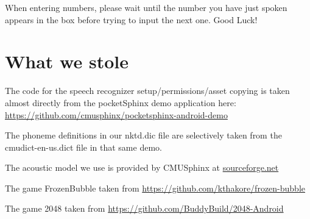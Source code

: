 \documentclass[11pt, oneside]{article}
\begin{document}
When entering numbers, please wait until the number you have just spoken appears
in the box before trying to input the next one.
Good Luck!

\section{What we stole}

The code for the speech recognizer setup/permissions/asset copying is
taken almost directly from the pocketSphinx demo application here:
\url{https://github.com/cmusphinx/pocketsphinx-android-demo}

The phoneme definitions in our nktd.dic file are selectively taken
from the cmudict-en-us.dict file in that same demo.

The acoustic model we use is provided by CMUSphinx at
\href{https://sourceforge.net/projects/cmusphinx/files/Acoustic\%20and\%20Language\%20Models/US\%20English/}{sourceforge.net}

The game FrozenBubble taken from
\url{https://github.com/kthakore/frozen-bubble}

The game 2048 taken from
\url{https://github.com/BuddyBuild/2048-Android}
    
\end{document}
